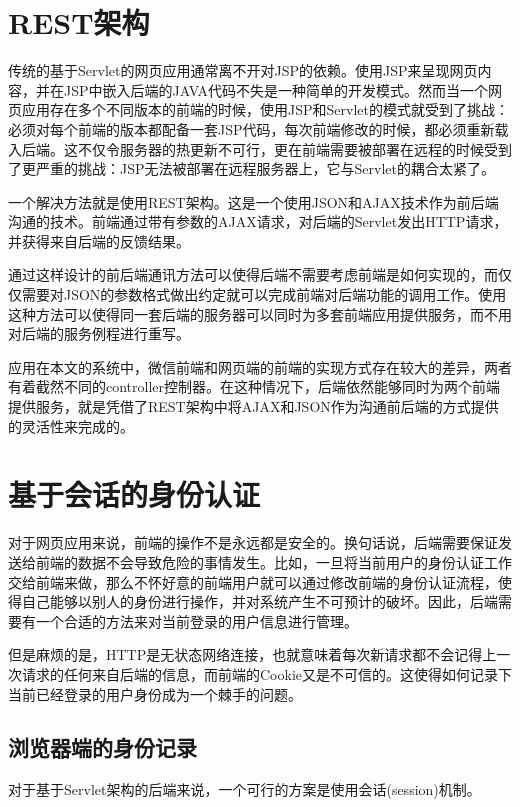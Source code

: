 \section{REST架构}

\label{rest}

传统的基于Servlet的网页应用通常离不开对JSP的依赖。使用JSP来呈现网页内容，并在JSP中嵌入后端的JAVA代码不失是一种简单的开发模式。然而当一个网页应用存在多个不同版本的前端的时候，使用JSP和Servlet的模式就受到了挑战：必须对每个前端的版本都配备一套JSP代码，每次前端修改的时候，都必须重新载入后端。这不仅令服务器的热更新不可行，更在前端需要被部署在远程的时候受到了更严重的挑战：JSP无法被部署在远程服务器上，它与Servlet的耦合太紧了。

一个解决方法就是使用REST架构。这是一个使用JSON和AJAX技术作为前后端沟通的技术。前端通过带有参数的AJAX请求，对后端的Servlet发出HTTP请求，并获得来自后端的反馈结果。

通过这样设计的前后端通讯方法可以使得后端不需要考虑前端是如何实现的，而仅仅需要对JSON的参数格式做出约定就可以完成前端对后端功能的调用工作。使用这种方法可以使得同一套后端的服务器可以同时为多套前端应用提供服务，而不用对后端的服务例程进行重写。

应用在本文的系统中，微信前端和网页端的前端的实现方式存在较大的差异，两者有着截然不同的controller控制器。在这种情况下，后端依然能够同时为两个前端提供服务，就是凭借了REST架构中将AJAX和JSON作为沟通前后端的方式提供的灵活性来完成的。

\section{基于会话的身份认证}

对于网页应用来说，前端的操作不是永远都是安全的。换句话说，后端需要保证发送给前端的数据不会导致危险的事情发生。比如，一旦将当前用户的身份认证工作交给前端来做，那么不怀好意的前端用户就可以通过修改前端的身份认证流程，使得自己能够以别人的身份进行操作，并对系统产生不可预计的破坏。因此，后端需要有一个合适的方法来对当前登录的用户信息进行管理。

但是麻烦的是，HTTP是无状态网络连接，也就意味着每次新请求都不会记得上一次请求的任何来自后端的信息，而前端的Cookie又是不可信的。这使得如何记录下当前已经登录的用户身份成为一个棘手的问题。

\subsection{浏览器端的身份记录}

对于基于Servlet架构的后端来说，一个可行的方案是使用会话(session)机制。

